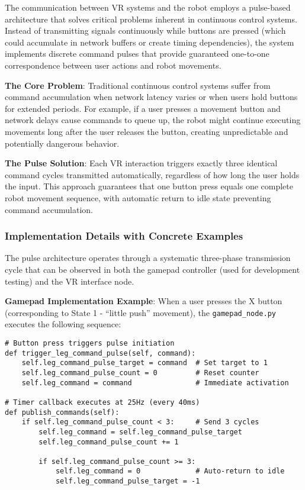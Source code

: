 The communication between VR systems and the robot employs a pulse-based architecture that solves critical problems inherent in continuous control systems. Instead of transmitting signals continuously while buttons are pressed (which could accumulate in network buffers or create timing dependencies), the system implements discrete command pulses that provide guaranteed one-to-one correspondence between user actions and robot movements.

\textbf{The Core Problem}: Traditional continuous control systems suffer from command accumulation when network latency varies or when users hold buttons for extended periods. For example, if a user presses a movement button and network delays cause commands to queue up, the robot might continue executing movements long after the user releases the button, creating unpredictable and potentially dangerous behavior.

\textbf{The Pulse Solution}: Each VR interaction triggers exactly three identical command cycles transmitted automatically, regardless of how long the user holds the input. This approach guarantees that one button press equals one complete robot movement sequence, with automatic return to idle state preventing command accumulation.

\subsubsection{Implementation Details with Concrete Examples}

The pulse architecture operates through a systematic three-phase transmission cycle that can be observed in both the gamepad controller (used for development testing) and the VR interface node. 

\textbf{Gamepad Implementation Example}: When a user presses the X button (corresponding to State 1 - ``little push'' movement), the \texttt{gamepad\_node.py} executes the following sequence:

\begin{verbatim}
# Button press triggers pulse initiation
def trigger_leg_command_pulse(self, command):
    self.leg_command_pulse_target = command  # Set target to 1
    self.leg_command_pulse_count = 0         # Reset counter
    self.leg_command = command               # Immediate activation

# Timer callback executes at 25Hz (every 40ms)
def publish_commands(self):
    if self.leg_command_pulse_count < 3:     # Send 3 cycles
        self.leg_command = self.leg_command_pulse_target
        self.leg_command_pulse_count += 1
        
        if self.leg_command_pulse_count >= 3:
            self.leg_command = 0             # Auto-return to idle
            self.leg_command_pulse_target = -1
\end{verbatim}

